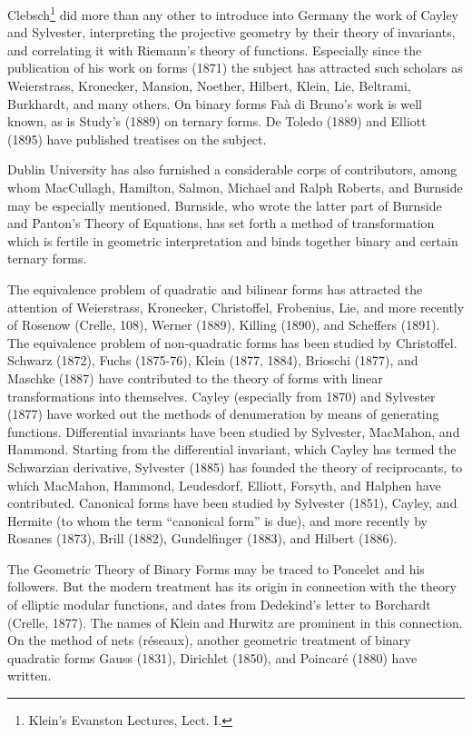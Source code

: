 \documentclass[oneside]{book}
\begin{document}
{Clebsch\footnote{Klein's Evanston Lectures, Lect. I.} did more than
any other to introduce into Germany the work of Cayley and
Sylvester, interpreting the projective geometry by their theory of
invariants, and correlating it with Riemann's theory of
functions. Especially since the publication of his work on forms
(1871) the subject has attracted such scholars as Weierstrass,
Kronecker, Mansion, Noether, Hilbert, Klein, Lie, Beltrami,
Burkhardt, and many others. On binary forms Fa\`a di Bruno's work is
well known, as is Study's (1889) on ternary forms. De Toledo (1889)
and Elliott (1895) have published treatises on the subject.

Dublin University has also furnished a considerable corps of
contributors, among whom MacCullagh, Hamilton, Salmon, Michael and
Ralph Roberts, and Burnside may be especially mentioned. Burnside,
who wrote the latter part of Burnside and Panton's Theory of
Equations, has set forth a method of transformation which is fertile
in geometric interpretation and binds together binary and certain
ternary forms.

The equivalence problem of quadratic and bilinear forms has
attracted the attention of Weierstrass, Kronecker, Christoffel,
Frobenius, Lie, and more recently of Rosenow (Crelle, 108), Werner
(1889), Killing (1890), and Scheffers (1891). The equivalence
problem of non-quadratic forms has been studied by
Christoffel. Schwarz (1872), Fuchs (1875-76), Klein (1877, 1884),
Brioschi (1877), and Maschke (1887) have contributed to the theory
of forms with linear transformations into themselves. Cayley
(especially from 1870) and Sylvester (1877) have worked out the
methods of denumeration by means of generating
functions. Differential invariants have been studied by Sylvester,
MacMahon, and Hammond. Starting from the differential invariant,
which Cayley has termed the Schwarzian derivative, Sylvester (1885)
has founded the theory of reciprocants, to which MacMahon, Hammond,
Leudesdorf, Elliott, Forsyth, and Halphen have
contributed. Canonical forms have been studied by Sylvester (1851),
Cayley, and Hermite (to whom the term ``canonical form'' is due),
and more recently by Rosanes (1873), Brill (1882), Gundelfinger
(1883), and Hilbert (1886).

The Geometric Theory of Binary Forms may be traced to Poncelet and
his followers. But the modern treatment has its origin in connection
with the theory of elliptic modular functions, and dates from
Dedekind's letter to Borchardt (Crelle, 1877). The names of Klein
and Hurwitz are prominent in this connection. On the method of nets
(r\'eseaux), another geometric treatment of binary quadratic forms
Gauss (1831), Dirichlet (1850), and Poincar\'e (1880) have written.

}
\end{document}
